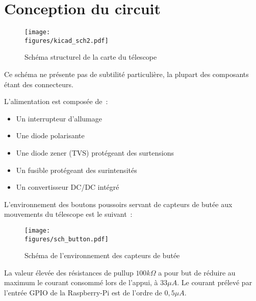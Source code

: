 \section{Conception du circuit}

\begin{figure}[H]
    \centering
    \texttt{[image: \\figures/kicad\_sch2.pdf]}
    \decoRule
    \caption[
    Schéma structurel de la carte du télescope]{
    Schéma structurel de la carte du télescope}
    \label{fig:Schéma structurel de la carte du télescope}
    \end{figure}

\vspace{1cm}

Ce schéma ne présente pas de subtilité particulière, la plupart des composants étant des connecteurs.

\vspace{1cm}

L'alimentation est composée de~:
\begin{itemize}[label=$\bullet$]
	\item Un interrupteur d'allumage
	\item Une diode polarisante
	\item Une diode zener (TVS) protégeant des surtensions
	\item Un fusible protégeant des surintensités
	\item Un convertisseur DC/DC intégré
	\end{itemize}

\vspace{1cm}

L'environnement des boutons poussoirs servant de capteurs de butée aux mouvements du télescope est le suivant~:

\begin{figure}[H]
    \centering
    \texttt{[image: \\figures/sch\_button.pdf]}
    \decoRule
    \caption[
    Schéma de l'environnement des capteurs de butée]{
    Schéma de l'environnement des capteurs de butée}
    \label{fig:Schéma de l'environnement des capteurs de butée}
    \end{figure}

\vspace{1cm}

La valeur élevée des résistances de pullup $100k\Omega$ a pour but de réduire au maximum le courant consommé lors de l'appui, à $33\mu A$. Le courant prélevé par l'entrée GPIO de la Raspberry-Pi est de l'ordre de $0,5\mu A$.

